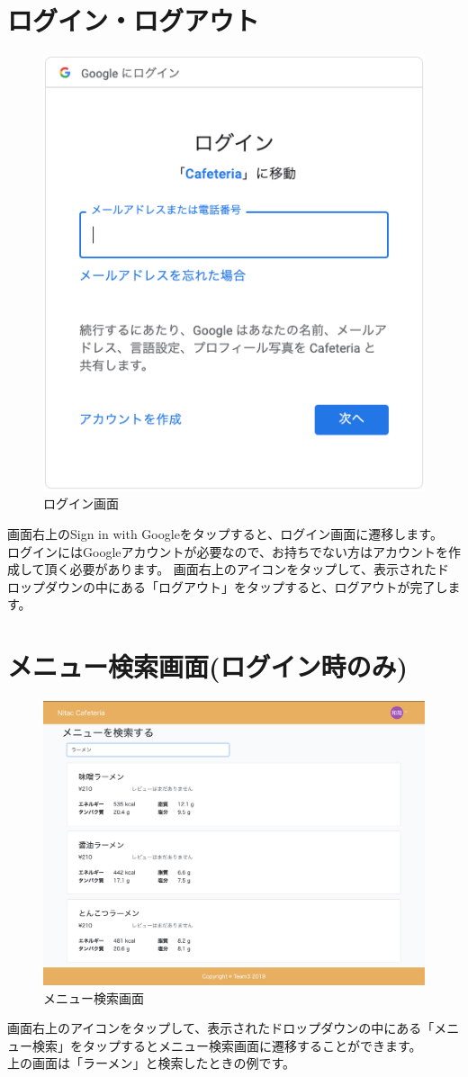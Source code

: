 \documentclass[a4paper]{jsarticle}
\begin{document}
\section{ログイン・ログアウト}
	\begin{figure}[htbp]
	\centering
		\caption{ログイン画面}
		\includegraphics[scale = 0.35]{image/login.png}
	\end{figure}
	画面右上のSign in with Googleをタップすると、ログイン画面に遷移します。\\
	ログインにはGoogleアカウントが必要なので、お持ちでない方はアカウントを作成して頂く必要があります。
	画面右上のアイコンをタップして、表示されたドロップダウンの中にある「ログアウト」をタップすると、ログアウトが完了します。
	\newpage
	\section{メニュー検索画面(ログイン時のみ)}
	\begin{figure}[htbp]
		\centering
			\caption{メニュー検索画面}
			\includegraphics[scale = 0.225]{image/menu_search_ramen.png}
		\end{figure}
		画面右上のアイコンをタップして、表示されたドロップダウンの中にある「メニュー検索」をタップするとメニュー検索画面に遷移することができます。\\
		上の画面は「ラーメン」と検索したときの例です。		
\end{document}
